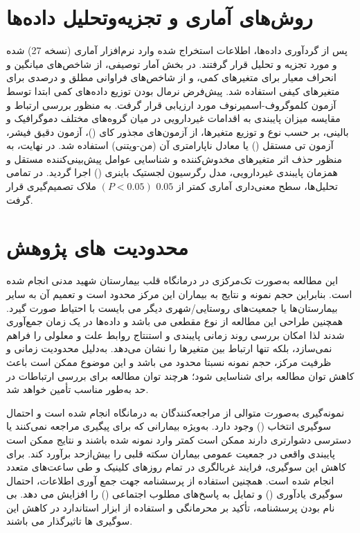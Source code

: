 \section{روش‌های آماری و تجزیه‌وتحلیل داده‌ها}
\label{sec:statistics}


پس از گردآوری داده‌ها، اطلاعات استخراج شده وارد نرم‌افزار آماری  (نسخه 27) شده و مورد تجزيه و تحلیل قرار گرفتند. در بخش آمار توصیفی، از شاخص‌های میانگین و انحراف معیار برای متغیرهای کمی، و از شاخص‌های فراوانی مطلق و درصدی برای متغیرهای کیفی استفاده شد. پیش‌فرض نرمال بودن توزیع داده‌های کمی ابتدا توسط آزمون کلموگروف-اسمیرنوف مورد ارزیابی قرار گرفت. به منظور بررسی ارتباط و مقایسه میزان پایبندی به اقدامات غیردارویی در میان گروه‌های مختلف دموگرافیک و بالینی، بر حسب نوع و توزیع متغیرها، از آزمون‌های مجذور کای ()، آزمون دقیق فیشر، آزمون تی مستقل () یا معادل ناپارامتری آن (من-ویتنی) استفاده شد. در نهایت، به منظور حذف اثر متغیرهای مخدوش‌کننده و شناسایی عوامل پیش‌بینی‌کننده مستقل و همزمان پایبندی غیردارویی، مدل رگرسیون لجستیک باینری () اجرا گردید. در تمامی تحلیل‌ها، سطح معنی‌داری آماری کمتر از $0.05$ $(P < 0.05)$ ملاک تصمیم‌گیری قرار گرفت.

\section{محدودیت های پژوهش}


این مطالعه به‌صورت تک‌مرکزی در درمانگاه قلب بیمارستان شهید مدنی انجام شده است. بنابراین حجم نمونه و نتایج به بیماران این مرکز محدود است و تعمیم آن به سایر بیمارستان‌ها یا جمعیت‌های روستایی/شهری دیگر می بایست با احتیاط صورت ‌گیرد. همچنین طراحی این مطالعه از نوع مقطعی می باشد و داده‌ها در یک زمان جمع‌آوری شدند لذا امکان بررسی روند زمانی پایبندی و استنتاج روابط علت و معلولی را فراهم نمی‌سازد، بلکه تنها ارتباط بین متغیرها را نشان می‌دهد. به‌دلیل محدودیت زمانی و ظرفیت مرکز، حجم نمونه نسبتا محدود می باشد و این موضوع ممکن است باعث کاهش توان مطالعه برای شناسایی  شود؛ هرچند توان مطالعه برای بررسی ارتباطات در حد  به‌طور مناسب تأمین خواهد شد.

نمونه‌گیری به‌صورت متوالی از مراجعه‌کنندگان به درمانگاه انجام شده است و احتمال سوگیری انتخاب () وجود دارد. به‌ویژه بیمارانی که برای پیگیری مراجعه نمی‌کنند یا دسترسی دشوارتری دارند ممکن است کمتر وارد نمونه شده باشند و نتایج ممکن است پایبندی واقعی در جمعیت عمومی بیماران سکته قلبی را بیش‌ازحد برآورد کند. برای کاهش این سوگیری، فرایند غربالگری در تمام روزهای کلینیک و طی ساعت‌های متعدد انجام شده است. همچنین استفاده از پرسشنامه جهت جمع آوری اطلاعات، احتمال سوگیری یادآوری () و تمایل به پاسخ‌های مطلوب اجتماعی () را افزایش می دهد. بی نام بودن پرسشنامه، تأکید بر محرمانگی و استفاده از ابزار استاندارد در کاهش این سوگیری ها تاثیرگذار می باشند.


